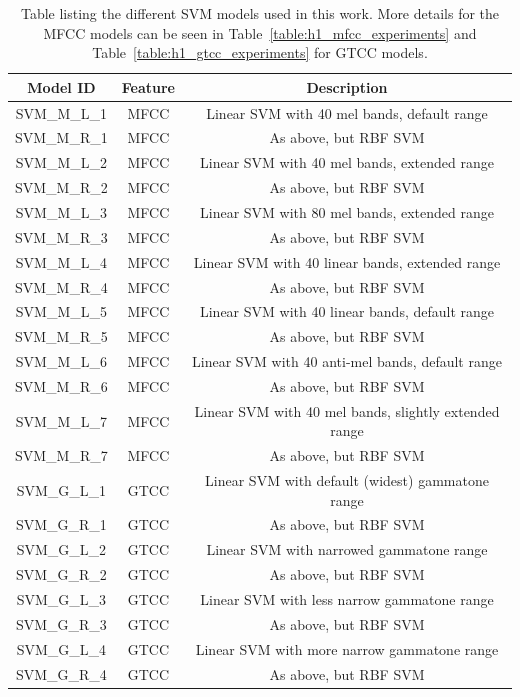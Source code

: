 \begin{table}
\begin{center}
\begin{tabular}{c c c}
\toprule
Model ID & Feature & Description \\ [0.5ex]
\midrule
SVM\_M\_L\_1 & MFCC & Linear SVM with 40 mel bands, default range \\
SVM\_M\_R\_1 & MFCC & As above, but RBF SVM \\
SVM\_M\_L\_2 & MFCC & Linear SVM with 40 mel bands, extended range \\
SVM\_M\_R\_2 & MFCC & As above, but RBF SVM \\
SVM\_M\_L\_3 & MFCC & Linear SVM with 80 mel bands, extended range \\
SVM\_M\_R\_3 & MFCC & As above, but RBF SVM \\
SVM\_M\_L\_4 & MFCC & Linear SVM with 40 linear bands, extended range \\
SVM\_M\_R\_4 & MFCC & As above, but RBF SVM \\
SVM\_M\_L\_5 & MFCC & Linear SVM with 40 linear bands, default range \\
SVM\_M\_R\_5 & MFCC & As above, but RBF SVM \\
SVM\_M\_L\_6 & MFCC & Linear SVM with 40 anti-mel bands, default range \\
SVM\_M\_R\_6 & MFCC & As above, but RBF SVM \\
SVM\_M\_L\_7 & MFCC & Linear SVM with 40 mel bands, slightly extended range \\
SVM\_M\_R\_7 & MFCC & As above, but RBF SVM \\
SVM\_G\_L\_1 & GTCC & Linear SVM with default (widest) gammatone range \\
SVM\_G\_R\_1 & GTCC & As above, but RBF SVM \\
SVM\_G\_L\_2 & GTCC & Linear SVM with narrowed gammatone range \\
SVM\_G\_R\_2 & GTCC & As above, but RBF SVM \\
SVM\_G\_L\_3 & GTCC & Linear SVM with less narrow gammatone range \\
SVM\_G\_R\_3 & GTCC & As above, but RBF SVM \\
SVM\_G\_L\_4 & GTCC & Linear SVM with more narrow gammatone range \\
SVM\_G\_R\_4 & GTCC & As above, but RBF SVM \\
\bottomrule
\end{tabular}
\caption{Table listing the different SVM models used in this work. More details
for the MFCC models can be seen in Table~\ref{table:h1_mfcc_experiments} and
Table~\ref{table:h1_gtcc_experiments} for GTCC models.}\label{table:svm_models}
\end{center}
\end{table}

